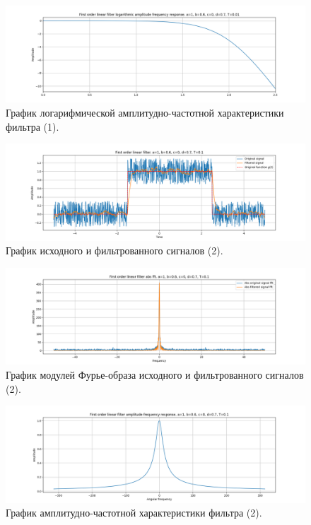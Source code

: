 \documentclass[a4paper, 12pt]{article}
\begin{document}
    \begin{figure}[H]
        \centering
        \includegraphics[scale=0.4]{1_lafr_filtered_linear.png}
        \captionsetup{skip=0pt}
        \caption{График логарифмической амплитудно-частотной характеристики фильтра (1).}
        \label{fig:filinlafr1}
    \end{figure}
    \begin{figure}[H]
        \centering
        \includegraphics[scale=0.4]{2_filtered_linear.png}
        \captionsetup{skip=0pt}
        \caption{График исходного и фильтрованного сигналов (2).}
        \label{fig:filin11}
    \end{figure}
    \begin{figure}[H]
        \centering
        \includegraphics[scale=0.4]{2_abs_filtered_linear.png}
        \captionsetup{skip=0pt}
        \caption{График модулей Фурье-образа исходного и фильтрованного сигналов (2).}
        \label{fig:filinabs11}
    \end{figure}
    \begin{figure}[H]
        \centering
        \includegraphics[scale=0.4]{2_afr_filtered_linear.png}
        \captionsetup{skip=0pt}
        \caption{График амплитудно-частотной характеристики фильтра (2).}
        \label{fig:filinafr11}
    \end{figure}
\end{document}
